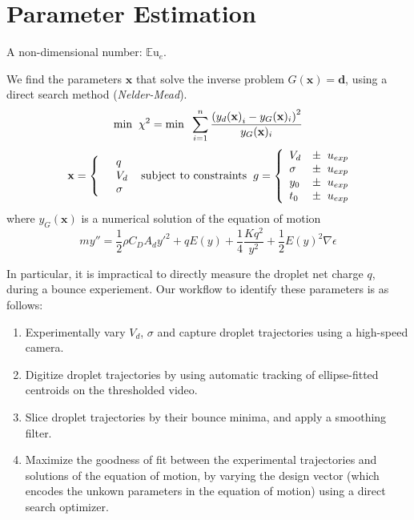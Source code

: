 \documentclass[10pt,a4paper]{article}
\author{Erin Schmidt}
\begin{document}
\section{Parameter Estimation}
A non-dimensional number: $ {\mathbb{E}\mbox{u}}_e$.

We find the parameters $\mathbf{x}$ that solve the inverse problem $G(\mathbf{x}) = \mathbf{d}$, using a direct search method (\emph{Nelder-Mead}). 
\[
\mbox{min} \hspace{2 mm} \chi^2 = \mbox{min} \hspace{2 mm} \sum^n_{i=1} \frac{\left({y_d(\mathbf{x})}_i - y_G(\mathbf{x})_i \right)^2}{y_G(\mathbf{x})_i}
\]
\begin{eqnarray*} \mbox{} \hspace{2 mm} \begin{split} \mathbf{x} = \left\{ \begin{array}{ll}      & q\\
		  &	V_d\\
          & \sigma 
          \end{array} \right. 
          \end{split} \hspace{2 mm} \mbox{subject to constraints} \hspace{2 mm} \begin{split}
          g = \left\{ \begin{array}{ll}
           V_d &\pm \hspace{2 mm} u_{exp}\\
      	   \sigma &\pm  \hspace{2 mm} u_{exp}\\
      	   y_0 &\pm \hspace{2 mm} u_{exp}\\
      	   t_0 &\pm \hspace{2 mm} u_{exp}\\
          \end{array} \right. 
          \end{split}
\end{eqnarray*}
where $y_G(\mathbf{x})$ is a numerical solution of the equation of motion
\[
m y'' = \frac{1}{2} \rho C_D A_d {y'}^2 + q E(y) + \frac{1}{4} \frac{K q^2}{y^2} + \frac{1}{2} {E(y)}^2 \nabla \epsilon\]

In particular, it is impractical to directly measure the droplet net charge $q$, during a bounce experiement. Our workflow to identify these parameters is as follows:
\begin{enumerate}
\item Experimentally vary $V_d$, $\sigma$ and capture droplet trajectories using a high-speed camera.
\item Digitize droplet trajectories by using automatic tracking of ellipse-fitted centroids on the thresholded video.
\item Slice droplet trajectories by their bounce minima, and apply a smoothing filter.
\item Maximize the goodness of fit between the experimental trajectories and solutions of the equation of motion, by varying the design vector (which encodes the unkown parameters in the equation of motion) using a direct search optimizer. 
\end{enumerate}
\end{document}
